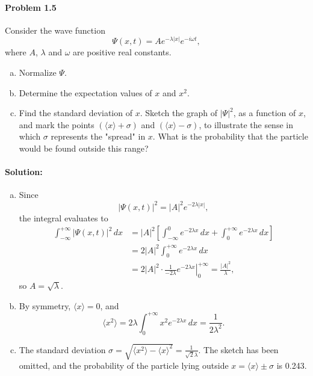 \documentclass{article}
\begin{document}
\paragraph{Problem 1.5} Consider the wave function \begin{equation*}
  \Psi(x, t) = Ae^{-\lambda|x|}e^{-i \omega t},
\end{equation*} where $A$, $\lambda$ and $\omega$ are positive real constants.
\begin{enumerate}[(a)]
  \item Normalize $\Psi$.
  \item Determine the expectation values of $x$ and $x^2$.
  \item Find the standard deviation of $x$. Sketch the graph of $|\Psi|^2$, as
    a function of $x$, and mark the points $(\langle x \rangle + \sigma)$ and
    $(\langle x \rangle - \sigma)$, to illustrate the sense in which $\sigma$
    represents the "spread" in $x$. What is the probability that the particle
    would be found outside this range?
\end{enumerate}

\paragraph{Solution:} \begin{enumerate}[(a)]
  \item Since \begin{equation*}
      |\Psi(x, t)|^2 = |A|^2e^{-2\lambda|x|},
    \end{equation*} the integral evaluates to \begin{align*}
      \int_{-\infty}^{+\infty} |\Psi(x, t)|^2 \,dx
      &= |A|^2\left[
        \int_{-\infty}^0 e^{-2\lambda x} \,dx +
        \int_0^{+\infty} e^{-2\lambda x} \,dx
      \right] \\
      &= 2|A|^2\int_0^{+\infty} e^{-2\lambda x} \,dx \\
      &= 2|A|^2 \cdot \left.
        \frac{1}{-2\lambda}e^{-2\lambda x}
      \right|_0^{+\infty} = \frac{|A|^2}{\lambda},
    \end{align*} so $A = \sqrt{\lambda}$.
  \item By symmetry, $\langle x \rangle = 0$, and \begin{equation*}
      \langle x^2 \rangle = 2\lambda\int_0^{+\infty} x^2e^{-2\lambda x}
      \,dx = \frac{1}{2\lambda^2}.
    \end{equation*}
  \item The standard deviation $\sigma = \sqrt{\langle x^2 \rangle -
    \langle x \rangle^2} = \frac{1}{\sqrt{2}\lambda}$. The sketch has been
    omitted, and the probability of the particle lying outside $x =
    \langle x \rangle \pm \sigma$ is 0.243.
\end{enumerate}
\end{document}
